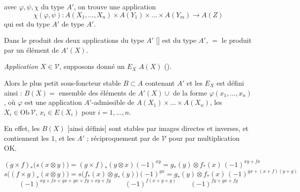 \documentclass[11pt,a4paper]{article}
\begin{document}

avec $\varphi, \psi, \chi$ du type $A'$, on trouve une application
\[
\chi(\varphi, \psi) : A(X_{1}, \dots, X_{n}) \times A(Y_{1}) \times \dots \times A(Y_{m}) \to A(Z)
\]
qui est  du type $A'$ \add{:} de type $A'$.

Dans le produit des deux applications  du type
$A'$ [\ill{}] est  du type $A'$,  $=$ le produit
par un élément de $A'(X)$.

\emph{Application}  \ill{}
$X \in \mathcal{V}$, supposons donné un $E_{X}$ \uncertain{$\subset$} $A(X)$
().

Alors le plus petit sous-foncteur stable $B \subset A$ contenant $A'$ et les
$E_{X}$ est défini ainsi :
$B(X) =$ ensemble des éléments de 
$A'(X) \cup$ \ill{}
de la forme $\varphi(x_{1}, \dots, x_{n})$, où $\varphi$ est une application
$A'$-admissible de $A(X_{1}) \times \dots \times A(X_{n})$, les
$X_{i} \in \mathrm{Ob}\, \mathcal{V}$, $x_{i} \in E(X_{i})$ pour
$i = 1, \dots, n$.

En effet, les $B(X)$ [ainsi définis] sont stables par images directes et
inverses, et contiennent les $1$, et les $A'$ ; réciproquement
 par \ill{} de $\mathcal{V}$ \ill{} pour \ill{} par
multiplication OK.




\[
(g \times f)_{*}\bigl(s(x \otimes y)\bigr) = (g \times f)_{*}(y \otimes x)(-1)^{xy} = g_{*}(y) \otimes f_{*}(x)\,(-1)^{xy + fx}
\]
\[
s\bigl((f \times g)_{*}(x \otimes y)\bigr) = s\bigl(f_{*}(x) \otimes g_{*}(y)\bigr)(-1)^{gx} = g_{*}(y) \otimes f_{*}(x)\,(-1)^{gx + (x+f)(y+g)}
\]
\[
(-1)^{xy + fx + gx + gx + fy + xy + fg} \qquad (-1)^{f(x+y+g)} \qquad (-1)^{fy + gx + fg}
\]
\end{document}
